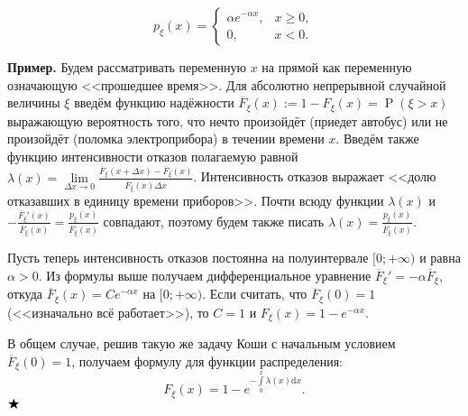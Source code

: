 \documentclass[12pt]{article}
\numberwithin{theorem}{section}
\theoremstyle{definition}
\newenvironment{example}{\indent \textbf{Пример.}}{$ \hfill \bigstar $}
\newcommand{\defin}[2]{\hypertarget{#2}{{\color{red} #1}}}
\newcommand{\prob}{\operatorname{P}}
\newcommand{\diff}{\mathrm{d}}
\begin{document}
	\begin{center}
		\begin{minipage}{0.45\textwidth}
			\[
			p_\xi(x) =
			\begin{cases}
				\alpha e^{-\alpha x}, & x \geqslant 0, \\
				0, & x < 0.
			\end{cases}
			\]
		\end{minipage}
		\begin{minipage}{0.5\textwidth}
		\end{minipage}
	\end{center}
	
	\begin{example}
		Будем рассматривать переменную $ x $ на прямой как переменную означающую <<прошедшее время>>.
		Для абсолютно непрерывной случайной величины $ \xi $ введём 
		\defin{функцию надёжности}{reliability-function} $ \overline{F}_\xi(x) := 1 - F_\xi(x) = \prob(\xi > x) $
		выражающую вероятность того, что нечто произойдёт (приедет автобус) или не произойдёт (поломка электроприбора)
		в течении времени $ x $. Введём также функцию \defin{интенсивности отказов}{failure-rate}
		полагаемую равной $ \lambda(x) = 
		\lim\limits_{\Delta x \to 0} \tfrac{\overline{F}_\xi(x + \Delta x) - \overline{F}_\xi(x)}{\overline{F}_\xi(x)\Delta x} $.
		Интенсивность отказов выражает <<долю отказавших в единицу времени приборов>>.
		Почти всюду функции $ \lambda(x) $ и 
		$ - \tfrac{\overline{F}_\xi'(x)}{\overline{F}_\xi(x)} = \tfrac{p_\xi(x)}{\overline{F}_\xi(x)} $
		совпадают, поэтому будем также писать $ \lambda(x) = \tfrac{p_\xi(x)}{\overline{F}_\xi(x)} $.
		
		Пусть теперь интенсивность отказов постоянна на полуинтервале $ [0;+\infty) $ и равна $ \alpha > 0 $.
		Из формулы выше получаем дифференциальное уравнение $ \overline{F}_\xi' = -\alpha\overline{F}_\xi $,
		откуда $ \overline{F}_\xi(x) = Ce^{-\alpha x} $ на $ [0;+\infty) $. 
		Если считать, что $ \overline{F}_\xi(0) = 1 $ (<<изначально всё работает>>), 
		то  $ C = 1 $ и $ F_\xi(x) = 1 - e^{-\alpha x} $.
		
		В общем случае, решив такую же задачу Коши с начальным условием $ \overline{F}_\xi(0) = 1 $,
		получаем формулу для функции распределения:
		$$ F_\xi(x) = 1 - e^{-\int\limits_{0}^{x} \lambda(x)\diff x}. $$
	\end{example}
	
\end{document}
